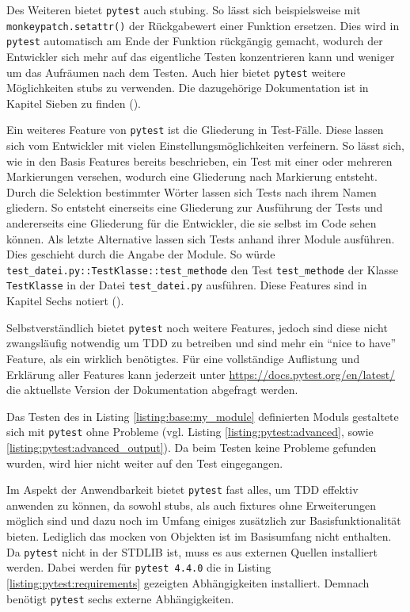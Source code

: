 Des Weiteren bietet \lstinline{pytest} auch \gls{stub}ing. So lässt sich
beispielsweise mit \lstinline{monkeypatch.setattr()} der Rückgabewert einer
Funktion ersetzen. Dies wird in \lstinline{pytest} automatisch am Ende der
Funktion rückgängig gemacht, wodurch der Entwickler sich mehr auf das
eigentliche Testen konzentrieren kann und weniger um das Aufräumen nach dem
Testen. Auch hier bietet \lstinline{pytest} weitere Möglichkeiten \Glspl{stub}
zu verwenden. Die dazugehörige Dokumentation ist in Kapitel Sieben zu finden
(\cite{docs.pytest.org:4.4}).

Ein weiteres Feature von \lstinline{pytest} ist die Gliederung in Test-Fälle.
Diese lassen sich vom Entwickler mit vielen Einstellungsmöglichkeiten
verfeinern. So lässt sich, wie in den Basis Features bereits beschrieben, ein
Test mit einer oder mehreren Markierungen versehen, wodurch eine Gliederung nach
Markierung entsteht. Durch die Selektion bestimmter Wörter lassen sich
Tests nach ihrem Namen gliedern. So entsteht einerseits eine Gliederung zur
Ausführung der Tests und andererseits eine Gliederung für die Entwickler, die
sie selbst im Code sehen können. Als letzte Alternative lassen sich Tests anhand
ihrer Module ausführen. Dies geschieht durch die Angabe der Module. So würde
\lstinline{test_datei.py::TestKlasse::test_methode} den Test
\lstinline{test_methode} der Klasse \lstinline{TestKlasse} in der Datei
\lstinline{test_datei.py} ausführen. Diese Features sind in Kapitel Sechs
notiert (\cite{docs.pytest.org:4.4}).

Selbstverständlich bietet \lstinline{pytest} noch weitere Features, jedoch sind
diese nicht zwangsläufig notwendig um TDD zu betreiben und sind mehr ein "`nice
to have"' Feature, als ein wirklich benötigtes. Für eine vollständige
Auflistung und Erklärung aller Features kann jederzeit unter
\url{https://docs.pytest.org/en/latest/} die aktuellste Version der
Dokumentation abgefragt werden.

Das Testen des in Listing \ref{listing:base:my_module} definierten Moduls
gestaltete sich mit \lstinline{pytest} ohne Probleme (vgl. Listing
\ref{listing:pytest:advanced}, sowie \ref{listing:pytest:advanced_output}). Da
beim Testen keine Probleme gefunden wurden,  wird hier nicht weiter auf den
Test eingegangen.
\newline

Im Aspekt der Anwendbarkeit bietet \lstinline{pytest} fast alles, um TDD 
effektiv anwenden zu können, da sowohl \Glspl{stub}, als auch \Glspl{fixture} 
ohne Erweiterungen möglich sind und dazu noch im Umfang einiges zusätzlich zur
Basisfunktionalität bieten. Lediglich das \Gls{mock}en von Objekten ist im 
Basisumfang nicht enthalten. Da \lstinline{pytest} nicht in der STDLIB ist, muss
es aus externen Quellen installiert werden. Dabei werden für
\lstinline{pytest 4.4.0} die in Listing \ref{listing:pytest:requirements}
gezeigten Abhängigkeiten installiert. Demnach benötigt \lstinline{pytest} sechs
externe Abhängigkeiten.

